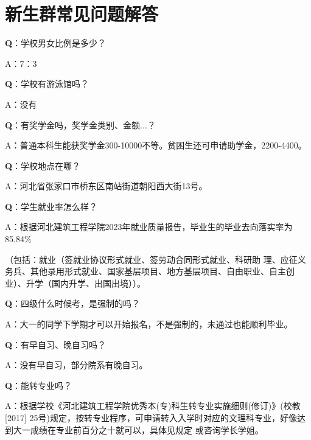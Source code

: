 \documentclass[12pt]{article} %
\begin{document}
	
		\newpage



\section{新生群常见问题解答} 
\textbf{Q}：学校男女比例是多少？

A：7：3

\textbf{Q}：学校有游泳馆吗？

A：没有

\textbf{Q}：有奖学金吗，奖学金类别、金额...？

A：普通本科生能获奖学金300-10000不等。贫困生还可申请助学金，2200-4400。

\textbf{Q}：学校地点在哪？

A：河北省张家口市桥东区南站街道朝阳西大街13号。

\textbf{Q}：学生就业率怎么样？

A：根据河北建筑工程学院2023年就业质量报告，毕业生的毕业去向落实率为 85.84$\%$

（包括：就业（签就业协议形式就业、签劳动合同形式就业、科研助
理、应征义务兵、其他录用形式就业、国家基层项目、地方基层项目、自由职业、自主创
业）、升学（国内升学、出国出境））。

\textbf{Q}：四级什么时候考，是强制的吗？

A：大一的同学下学期才可以开始报名，不是强制的，未通过也能顺利毕业。

\textbf{Q}：有早自习、晚自习吗？

A：没有早自习，部分院系有晚自习。

\textbf{Q}：能转专业吗？

A：根据学校《河北建筑工程学院优秀本(专)科生转专业实施细则(修订)》(校教[2017] 25号)规定，按转专业程序，可申请转入入学时对应的文理科专业，好像达到大一成绩在专业前百分之十就可以，具体见规定 或咨询学长学姐。
\end{document}
